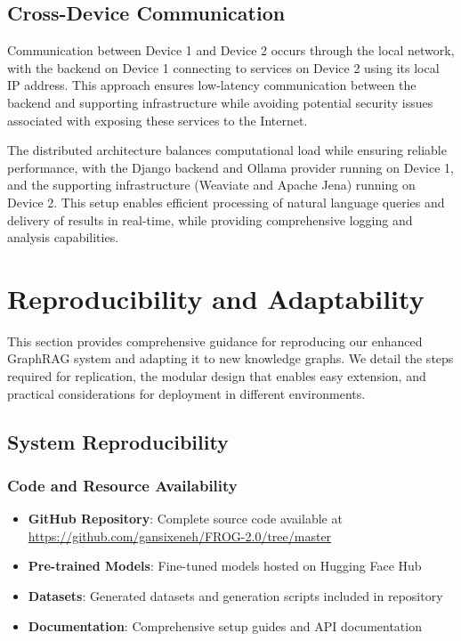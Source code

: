 \subsection{Cross-Device Communication}
Communication between Device 1 and Device 2 occurs through the local network, with the backend on Device 1 connecting to services on Device 2 using its local IP address. This approach ensures low-latency communication between the backend and supporting infrastructure while avoiding potential security issues associated with exposing these services to the Internet.

The distributed architecture balances computational load while ensuring reliable performance, with the Django backend and Ollama provider running on Device 1, and the supporting infrastructure (Weaviate and Apache Jena) running on Device 2. This setup enables efficient processing of natural language queries and delivery of results in real-time, while providing comprehensive logging and analysis capabilities.

\section{Reproducibility and Adaptability}
\label{sec:reproducibility}

This section provides comprehensive guidance for reproducing our enhanced GraphRAG system and adapting it to new knowledge graphs. We detail the steps required for replication, the modular design that enables easy extension, and practical considerations for deployment in different environments.

\subsection{System Reproducibility}
\label{subsec:reproducibility-setup}

\subsubsection{Code and Resource Availability}
\begin{itemize}
    \item \textbf{GitHub Repository}: Complete source code available at \url{https://github.com/gansixeneh/FROG-2.0/tree/master}
    \item \textbf{Pre-trained Models}: Fine-tuned models hosted on Hugging Face Hub
    \item \textbf{Datasets}: Generated datasets and generation scripts included in repository
    \item \textbf{Documentation}: Comprehensive setup guides and API documentation
\end{itemize}

